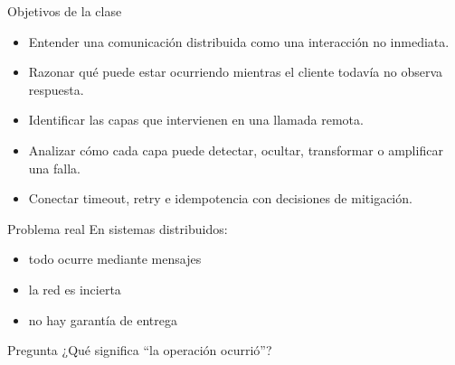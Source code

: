 \documentclass[institutional,screen,none]{ua-engineering-v6-beamer}
\title{\UACourse}
\subtitle{Clase 02 --- RPC, timeouts, retries e idempotencia}
\author{\UAProfessor}
\date{\UADate}
\begin{document}
{
\begin{frame}[plain]
\titlepage
\end{frame}
}


\begin{frame}{Objetivos de la clase}
\begin{itemize}
\item Entender una comunicación distribuida como una interacción no inmediata.
\item Razonar qué puede estar ocurriendo mientras el cliente todavía no observa respuesta.
\item Identificar las capas que intervienen en una llamada remota.
\item Analizar cómo cada capa puede detectar, ocultar, transformar o amplificar una falla.
\item Conectar timeout, retry e idempotencia con decisiones de mitigación.
\end{itemize}
\end{frame}

\begin{frame}{Problema real}
En sistemas distribuidos:

\begin{itemize}
\item todo ocurre mediante mensajes
\item la red es incierta
\item no hay garantía de entrega
\end{itemize}

\begin{block}{Pregunta}
¿Qué significa ``la operación ocurrió''?
\end{block}
\end{frame}
\end{document}
